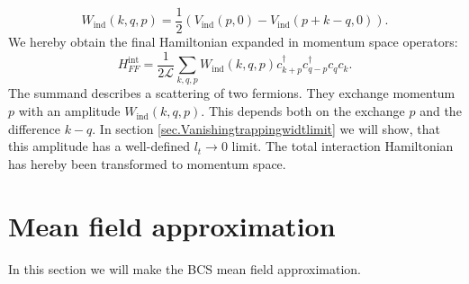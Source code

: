 \begin{equation}
W_{\text{ind}}(k, q, p) = \frac{1}{2}\left(V_\text{ind}\left( p, 0 \right) - V_\text{ind}\left( p + k - q, 0 \right) \right). 
\label{eq.Wkqp.scattering.amplitude}
\end{equation}
We hereby obtain the final Hamiltonian expanded in momentum space operators:
\begin{equation}
H^\text{int}_{FF} = \frac{1}{2\mathcal{L}} \sum_{k,q,p} W_{\text{ind}}(k, q, p) c^\dagger_{k+p} c^\dagger_{q-p} c_{q} c_{k}. 
\label{eq.HintMomentumSpace}
\end{equation}
The summand describes a scattering of two fermions. They exchange momentum $p$ with an amplitude $W_{\text{ind}}(k, q, p)$. This depends both on the exchange $p$ and the difference $k - q$. In section \ref{sec.Vanishingtrappingwidtlimit} we will show, that this amplitude has a well-defined $l_t \to 0$ limit. The total interaction Hamiltonian has hereby been transformed to momentum space. 

\clearpage

\section{Mean field approximation} \label{sec.meanfieldapproximation}
In this section we will make the BCS mean field approximation. 


